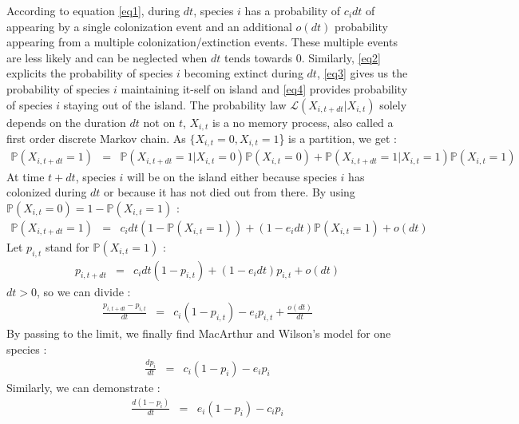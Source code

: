 According to equation \eqref{eq1}, during $dt$, species $i$ has a probability of $c_idt$ of appearing by a single colonization event and an additional $o(dt)$ probability appearing from a multiple colonization/extinction events. These multiple events are less likely and can be neglected when $dt$ tends towards $0$. Similarly, \eqref{eq2} explicits the probability of species $i$ becoming extinct during $dt$, \eqref{eq3} gives us the probability of species $i$ maintaining it-self on island and \eqref{eq4} provides probability of species $i$ staying out of the island. The probability law $\mathcal{L}(X_{i,t+dt}|X_{i,t})$ solely depends on the duration $dt$ not on $t$, $X_{i,t}$ is a no memory process, also called a first order discrete Markov chain. As $ \{X_{i,t}=0, X_{i,t}=1$\} is a partition, we get :
\begin{eqnarray}
\label{eq6}  \mathbb{P}(X_{i,t+dt}=1)&=& \mathbb{P}(X_{i,t+dt}=1|X_{i,t}=0) \mathbb{P}(X_{i,t}=0)+ \mathbb{P}(X_{i,t+dt}=1|X_{i,t}=1) \mathbb{P}(X_{i,t}=1)
\end{eqnarray}
At time $t+dt$, species $i$ will be on the island either because species $i$ has colonized during $dt$ or because it has not died out from there. By using $ \mathbb{P}(X_{i,t}=0)=1- \mathbb{P}(X_{i,t}=1)$ :
\begin{eqnarray}
\label{eq7}  \mathbb{P}(X_{i,t+dt}=1)&=&c_idt(1- \mathbb{P}(X_{i,t}=1))+(1-e_idt) \mathbb{P}(X_{i,t}=1)+o(dt)
\end{eqnarray}
Let $p_{i,t}$ stand for $ \mathbb{P}(X_{i,t}=1)$ :
\begin{eqnarray}
\label{eq8} p_{i,t+dt}&=&c_idt(1-p_{i,t})+(1-e_idt)p_{i,t}+o(dt)
\end{eqnarray}
$dt>0$, so we can divide :
\begin{eqnarray}
\label{eq8} \frac{p_{i,t+dt}-p_{i,t}}{dt}&=&c_i(1-p_{i,t})-e_ip_{i,t}+\frac{o(dt)}{dt}
\end{eqnarray}
By passing to the limit, we finally find MacArthur and Wilson's model for one species :
\begin{eqnarray}
\label{eq9} \frac{dp_{i}}{dt}&=&c_i(1-p_{i})-e_ip_{i}
\end{eqnarray}
Similarly, we can demonstrate :
\begin{eqnarray}
\label{eq10} \frac{d(1-p_{i})}{dt}&=&e_i(1-p_{i})-c_ip_{i}
\end{eqnarray}

